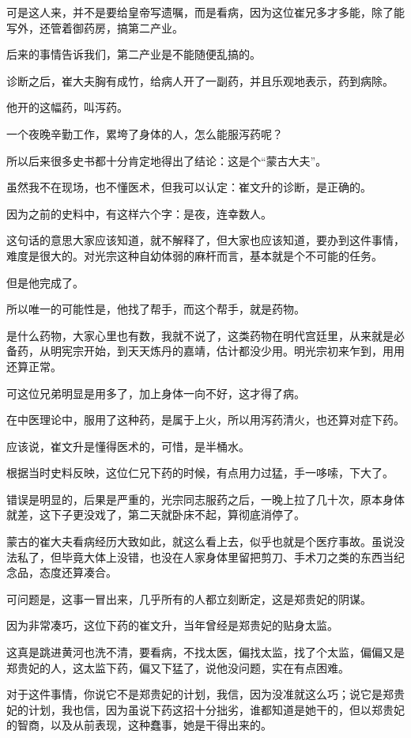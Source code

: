 \begin{multicols}{\theparacolNo}
		可是这人来，并不是要给皇帝写遗嘱，而是看病，因为这位崔兄多才多能，除了能写外，还管着御药房，搞第二产业。

		后来的事情告诉我们，第二产业是不能随便乱搞的。

		诊断之后，崔大夫胸有成竹，给病人开了一副药，并且乐观地表示，药到病除。

		他开的这幅药，叫泻药。

		一个夜晚辛勤工作，累垮了身体的人，怎么能服泻药呢？

		所以后来很多史书都十分肯定地得出了结论：这是个“蒙古大夫”。

		虽然我不在现场，也不懂医术，但我可以认定：崔文升的诊断，是正确的。

		因为之前的史料中，有这样六个字：是夜，连幸数人。

		这句话的意思大家应该知道，就不解释了，但大家也应该知道，要办到这件事情，难度是很大的。对光宗这种自幼体弱的麻杆而言，基本就是个不可能的任务。

		但是他完成了。

		所以唯一的可能性是，他找了帮手，而这个帮手，就是药物。

		是什么药物，大家心里也有数，我就不说了，这类药物在明代宫廷里，从来就是必备药，从明宪宗开始，到天天炼丹的嘉靖，估计都没少用。明光宗初来乍到，用用还算正常。

		可这位兄弟明显是用多了，加上身体一向不好，这才得了病。

		在中医理论中，服用了这种药，是属于上火，所以用泻药清火，也还算对症下药。

		应该说，崔文升是懂得医术的，可惜，是半桶水。

		根据当时史料反映，这位仁兄下药的时候，有点用力过猛，手一哆嗦，下大了。

		错误是明显的，后果是严重的，光宗同志服药之后，一晚上拉了几十次，原本身体就差，这下子更没戏了，第二天就卧床不起，算彻底消停了。

		蒙古的崔大夫看病经历大致如此，就这么看上去，似乎也就是个医疗事故。虽说没法私了，但毕竟大体上没错，也没在人家身体里留把剪刀、手术刀之类的东西当纪念品，态度还算凑合。

		可问题是，这事一冒出来，几乎所有的人都立刻断定，这是郑贵妃的阴谋。

		因为非常凑巧，这位下药的崔文升，当年曾经是郑贵妃的贴身太监。

		这真是跳进黄河也洗不清，要看病，不找太医，偏找太监，找了个太监，偏偏又是郑贵妃的人，这太监下药，偏又下猛了，说他没问题，实在有点困难。

		对于这件事情，你说它不是郑贵妃的计划，我信，因为没准就这么巧；说它是郑贵妃的计划，我也信，因为虽说下药这招十分拙劣，谁都知道是她干的，但以郑贵妃的智商，以及从前表现，这种蠢事，她是干得出来的。


\end{multicols}
